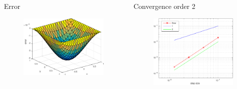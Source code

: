 \documentclass[screen]{beamer}
\begin{document}
\begin{frame}

\begin{columns}   
    \begin{column}{.5\linewidth}
    \centering
    Error
        \begin{figure}
  		\includegraphics[scale=0.4]{figures/error_linEl}
  		\end{figure}
    \end{column}   
    \begin{column}{.5\linewidth}
	\centering
	Convergence order 2
        \begin{figure}
  		\includegraphics[scale=0.34]{figures/conv_linEl}
  		\end{figure}
    \end{column}
  \end{columns}

\end{frame}
\end{document}
